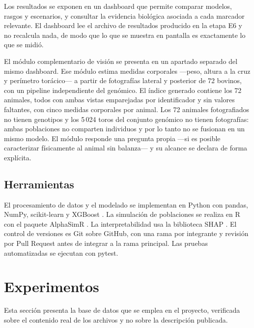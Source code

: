 \documentclass[conference]{IEEEtran}
\begin{document}
Los resultados se exponen en un dashboard que permite comparar modelos,
rasgos y escenarios, y consultar la evidencia biológica asociada a cada
marcador relevante. El dashboard lee el archivo de resultados producido en
la etapa E6 y no recalcula nada, de modo que lo que se muestra en pantalla
es exactamente lo que se midió.

El módulo complementario de visión se presenta en un apartado separado del
mismo dashboard. Ese módulo estima medidas corporales —peso, altura a la
cruz y perímetro torácico— a partir de fotografías lateral y posterior de
72 bovinos, con un pipeline independiente del genómico. El índice generado
contiene los 72 animales, todos con ambas vistas emparejadas por
identificador y sin valores faltantes, con cinco medidas corporales por
animal. Los 72 animales
fotografiados no tienen genotipos y los 5\,024 toros del conjunto genómico
no tienen fotografías: ambas poblaciones no comparten individuos y por lo
tanto no se fusionan en un mismo modelo. El módulo responde una pregunta
propia —si es posible caracterizar físicamente al animal sin balanza— y su
alcance se declara de forma explícita.

\subsection{Herramientas}

El procesamiento de datos y el modelado se implementan en Python con
pandas, NumPy, scikit-learn y XGBoost \cite{xgboost}. La simulación de
poblaciones se realiza en R con el paquete AlphaSimR \cite{alphasimr}. La
interpretabilidad usa la biblioteca SHAP \cite{shap}. El control de
versiones es Git sobre GitHub, con una rama por integrante y revisión por
Pull Request antes de integrar a la rama principal. Las pruebas
automatizadas se ejecutan con pytest.

\section{Experimentos}

Esta sección presenta la base de datos que se emplea en el proyecto,
verificada sobre el contenido real de los archivos y no sobre la
descripción publicada.

\end{document}
